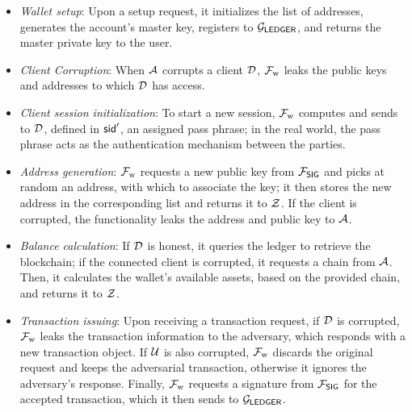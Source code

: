 \begin{itemize}
    \item \emph{Wallet setup}: Upon a setup request, it initializes the list
        of addresses, generates the account's master key, registers to
        $\mathcal{G}_\mathsf{LEDGER}$, and returns the master private key to the user.
    \item \emph{Client Corruption}: When $\mathcal{A}$ corrupts a client
        $\mathcal{D}$, $\mathcal{F}_{\mathrm{w}}$ leaks the public keys and addresses to which $\mathcal{D}$
        has access.
    \item \emph{Client session initialization}: To start a new session, $\mathcal{F}_{\mathrm{w}}$
        computes and sends to $\mathcal{D}$, defined in $\mathsf{sid}'$, an assigned pass
        phrase; in the real world, the pass phrase acts as the authentication
        mechanism between the parties.
     \item \emph{Address generation}: $\mathcal{F}_{\mathrm{w}}$ requests a new public key from
         $\mathcal{F}_\mathsf{SIG}$ and picks at random an address, with which to associate the
         key; it then stores the new address in the corresponding list and
         returns it to $\mathcal{Z}$. If the client is corrupted, the functionality
         leaks the address and public key to $\mathcal{A}$.
    \item \emph{Balance calculation}: If $\mathcal{D}$ is honest, it queries the
        ledger to retrieve the blockchain; if the connected client is
        corrupted, it requests a chain from $\mathcal{A}$. Then, it calculates
        the wallet's available assets, based on the provided chain, and returns
        it to $\mathcal{Z}$.
    \item \emph{Transaction issuing}: Upon receiving a transaction request, if
        $\mathcal{D}$ is corrupted, $\mathcal{F}_{\mathrm{w}}$ leaks the transaction information to the
        adversary, which responds with a new transaction object. If $\mathcal{U}$ is
        also corrupted, $\mathcal{F}_{\mathrm{w}}$ discards the original request and keeps the
        adversarial transaction, otherwise it ignores the adversary's response.
        Finally, $\mathcal{F}_{\mathrm{w}}$ requests a signature from $\mathcal{F}_\mathsf{SIG}$ for the accepted
        transaction, which it then sends to $\mathcal{G}_\mathsf{LEDGER}$.
\end{itemize}

